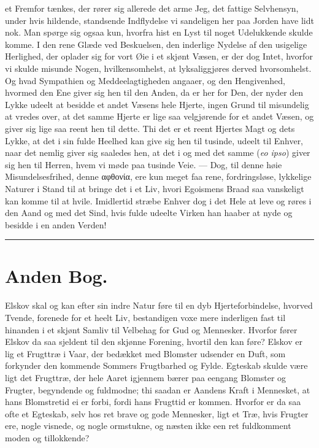 \documentclass[12pt,a4paper]{book}
\newcommand{\apage}[1]{\marginnote{\footnotesize\textit{[#1]}}}
\begin{document}
et Fremfor tænkes, der rører sig allerede det arme Jeg, det fattige
Selvhensyn, under hvis hildende, standsende Indflydelse vi sandeligen
her paa Jorden have lidt nok. Man spørge sig ogsaa kun, hvorfra hist en
Lyst til noget Udelukkende skulde komme. I den rene Glæde ved
Beskuelsen, den inderlige Nydelse af den usigelige Herlighed, der
oplader sig for vort Øie i et skjønt Væsen, er der dog Intet, hvorfor vi
skulde misunde Nogen, hvilkensomhelst, at lyksaliggjøres derved
hvorsomhelst. Og \apage{69} hvad Sympathien og Meddeelagtigheden angaaer, og den
Hengivenhed, hvormed den Ene giver sig hen til den Anden, da er her for
Den, der nyder den Lykke udeelt at besidde et andet Væsens hele Hjerte,
ingen Grund til misundelig at vredes over, at det samme Hjerte er lige
saa velgjørende for et andet Væsen, og giver sig lige saa reent hen til
dette. Thi det er et reent Hjertes Magt og dets Lykke, at det i sin
fulde Heelhed kan give sig hen til tusinde, udeelt til Enhver, naar det
nemlig giver sig saaledes hen, at det i og med det samme (\textit{eo ipso}) giver
sig hen til Herren, hvem vi møde paa tusinde Veie. --- Dog, til denne
høie Misundelsesfrihed, denne αφθονία, ere kun meget faa rene,
fordringsløse, lykkelige Naturer i Stand til at bringe det i et Liv,
hvori Egoismens Braad saa vanskeligt kan komme til at hvile. Imidlertid
stræbe Enhver dog i det Hele at leve og røres i den Aand og med det
Sind, hvis fulde udeelte Virken han haaber at nyde og besidde i en anden
Verden!

\begin{center}\rule{0.28\linewidth}{0.4pt}\end{center}

\chapter*{Anden Bog.}
 \apage{70}

Elskov skal og kan efter sin indre Natur føre til en dyb
Hjerteforbindelse, hvorved Tvende, forenede for et heelt Liv,
bestandigen voxe mere inderligen fast til hinanden i et skjønt Samliv
til Velbehag for Gud og Mennesker. Hvorfor fører Elskov da saa sjeldent
til den skjønne Forening, hvortil den kan føre? Elskov er lig et
Frugttræ i Vaar, der bedækket med Blomster udsender en Duft, som
forkynder den kommende Sommers Frugtbarhed og Fylde. Egteskab skulde
være ligt det Frugttræ, der hele Aaret igjennem bærer paa eengang
Blomster og Frugter, begyndende og fuldmodne; thi saadan er Aandens
Kraft i Mennesket, at hans Blomstretid ei er forbi, fordi hans Frugttid
er kommen. Hvorfor er da saa ofte et Egteskab, selv hos ret brave og
gode Mennesker, ligt et Træ, hvis Frugter ere, nogle visnede, og nogle
ormstukne, og næsten ikke een ret fuldkomment moden og tillokkende? \apage{71}
\end{document}
